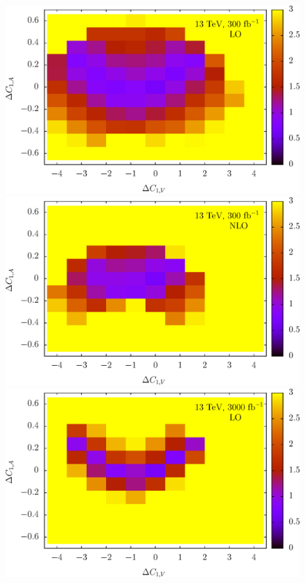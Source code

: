 \documentclass[preprint]{JHEP3}
\begin{document}
\begin{figure}[t]
\\
\includegraphics[scale=0.5]{LHC_53_LLSign_13LO300.eps} 
\includegraphics[scale=0.5]{LHC_53_LLSign_13NLO300.eps} 
\\
\includegraphics[scale=0.5]{LHC_53_LLSign_13LO3000.eps} 

\end{figure}
\end{document}
